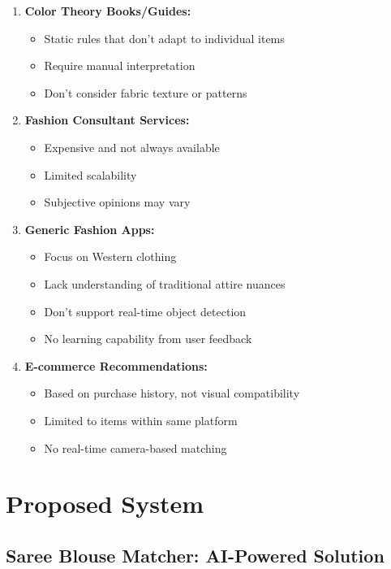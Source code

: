 \documentclass[12pt,a4paper]{report}
\begin{document}
\begin{enumerate}
    \item \textbf{Color Theory Books/Guides:}
    \begin{itemize}
        \item Static rules that don't adapt to individual items
        \item Require manual interpretation
        \item Don't consider fabric texture or patterns
    \end{itemize}
    
    \item \textbf{Fashion Consultant Services:}
    \begin{itemize}
        \item Expensive and not always available
        \item Limited scalability
        \item Subjective opinions may vary
    \end{itemize}
    
    \item \textbf{Generic Fashion Apps:}
    \begin{itemize}
        \item Focus on Western clothing
        \item Lack understanding of traditional attire nuances
        \item Don't support real-time object detection
        \item No learning capability from user feedback
    \end{itemize}
    
    \item \textbf{E-commerce Recommendations:}
    \begin{itemize}
        \item Based on purchase history, not visual compatibility
        \item Limited to items within same platform
        \item No real-time camera-based matching
    \end{itemize}
\end{enumerate}

\section{Proposed System}

\subsection{Saree Blouse Matcher: AI-Powered Solution}
\end{document}
